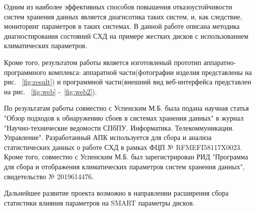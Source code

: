 \conclusion
Одним из наиболее эффективных способов повышения отказоустойчивости систем хранения данных является диагнсотика таких систем, и, как следствие, мониторинг параметров в таких системах. 
В данной работе описана методика диагностирования состояний СХД на примере жестких дисков с использованием климатических параметров.

Кроме того, результатом работы является изготовленый прототип аппаратно-программного комплекса: аппаратной части(фотографии изделия представлены на рис. ~\ref{fig:result}) и программной части(внешний вид веб-интерфейса представлен на рис. ~\ref{fig:web} -~\ref{fig:web2}).

По результатам работы совместно с Успенским М.Б. была подана научная статья "Обзор подходов к обнаружению сбоев в системах хранения данных" в журнал "Научно-технические ведомости СПбПУ. Информатика. Телекоммуникации. Управление". Разработанный АПК используется для сбора и анализа статистических данных о работе СХД в рамках ФЦП № RFMEFI58117X0023. 
Кроме того, совместно с Успенским М.Б. был зарегистрирован РИД "Программа для сбора и отображения климатических параметров систем хранения данных", свидетельство № 2019614476. 

Дальнейшее развитие проекта возможно в направлении расширения сбора статистики влияния параметров на SMART параметры дисков.